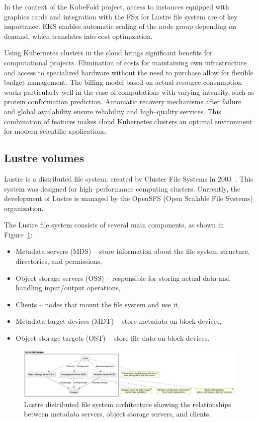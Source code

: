 In the context of the KubeFold project, access to instances equipped with graphics cards and integration with the FSx for Lustre file system are of key importance.
EKS enables automatic scaling of the node group depending on demand, which translates into cost optimization.

Using Kubernetes clusters in the cloud brings significant benefits for computational projects.
Elimination of costs for maintaining own infrastructure and access to specialized hardware without the need to purchase allow for flexible budget management.
The billing model based on actual resource consumption works particularly well in the case of computations with varying intensity, such as protein conformation prediction.
Automatic recovery mechanisms after failure and global availability ensure reliability and high--quality services.
This combination of features makes cloud Kubernetes clusters an optimal environment for modern scientific applications.

\subsection{Lustre volumes}\label{subsec:lustre-volumes}

Lustre is a distributed file system, created by Cluster File Systems in 2003~\cite{lustre_fs}.
This system was designed for high--performance computing clusters.
Currently, the development of Lustre is managed by the OpenSFS (Open Scalable File Systems) organization.

The Lustre file system consists of several main components, as shown in Figure~\ref{fig:lustre-arch}:
\begin{itemize}
    \item Metadata servers (MDS) -- store information about the file system structure, directories, and permissions,
    \item Object storage servers (OSS) -- responsible for storing actual data and handling input/output operations,
    \item Clients -- nodes that mount the file system and use it,
    \item Metadata target devices (MDT) -- store metadata on block devices,
    \item Object storage targets (OST) -- store file data on block devices.
\end{itemize}

\begin{figure}[htbp]
    \centering
    \includegraphics[width=\textwidth]{images/lustre}
    \caption{Lustre distributed file system architecture showing the relationships between metadata servers, object storage servers, and clients.}
    \label{fig:lustre-arch}
\end{figure}

